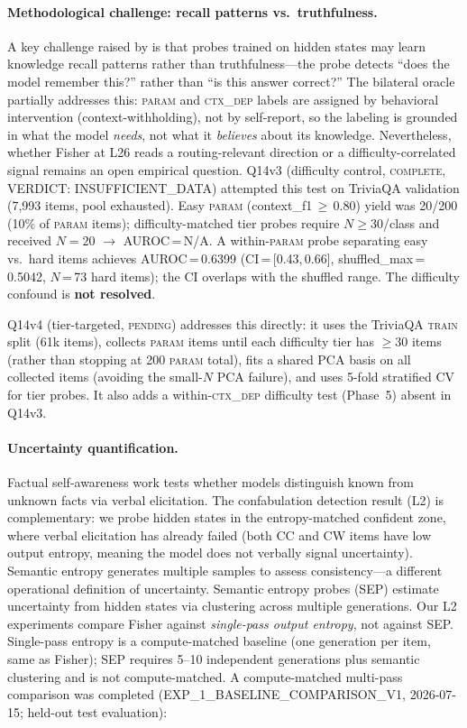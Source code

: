\documentclass[11pt]{article}
\begin{document}
\paragraph{Methodological challenge: recall patterns vs.\ truthfulness.}
A key challenge raised by \citet{dollmsknow2024} is that probes trained on hidden states
may learn knowledge recall patterns rather than truthfulness---the probe detects ``does
the model remember this?'' rather than ``is this answer correct?''
The bilateral oracle partially addresses this: \textsc{param} and \textsc{ctx\_dep}
labels are assigned by behavioral intervention (context-withholding), not by self-report,
so the labeling is grounded in what the model \emph{needs}, not what it \emph{believes}
about its knowledge.
Nevertheless, whether Fisher at L26 reads a routing-relevant direction or a
difficulty-correlated signal remains an open empirical question.
Q14v3 (difficulty control, \textsc{complete}, VERDICT: INSUFFICIENT\_DATA) attempted
this test on TriviaQA validation (7,993 items, pool exhausted). Easy \textsc{param}
(context\_f1\,$\geq$\,0.80) yield was 20/200 (10\% of \textsc{param} items);
difficulty-matched tier probes require $N\geq 30$/class and received $N=20$ $\to$ AUROC\,=\,N/A.
A within-\textsc{param} probe separating easy vs.\ hard items achieves AUROC\,=\,0.6399
(CI\,=\,[0.43,\,0.66], shuffled\_max\,=\,0.5042, $N$\,=\,73 hard items); the CI overlaps
with the shuffled range. The difficulty confound is \textbf{not resolved}.

Q14v4 (tier-targeted, \textsc{pending}) addresses this directly: it uses the TriviaQA
\textsc{train} split (61k items), collects \textsc{param} items until each difficulty
tier has $\geq 30$ items (rather than stopping at 200 \textsc{param} total), fits a
shared PCA basis on all collected items (avoiding the small-$N$ PCA failure), and uses
5-fold stratified CV for tier probes. It also adds a within-\textsc{ctx\_dep} difficulty
test (Phase~5) absent in Q14v3.

\paragraph{Uncertainty quantification.}
Factual self-awareness work \citep{kadavath2022know} tests whether models distinguish
known from unknown facts via verbal elicitation. The confabulation detection result (L2)
is complementary: we probe hidden states in the entropy-matched confident zone, where
verbal elicitation has already failed (both CC and CW items have low output entropy,
meaning the model does not verbally signal uncertainty).
Semantic entropy \citep{kuhn2023semantic} generates multiple samples to assess
consistency---a different operational definition of uncertainty. Semantic entropy
probes \citep{sepprobes2024} (SEP) estimate uncertainty from hidden states via
clustering across multiple generations.
Our L2 experiments compare Fisher against \emph{single-pass output entropy}, not
against SEP. Single-pass entropy is a compute-matched baseline (one generation per
item, same as Fisher); SEP requires 5--10 independent generations plus semantic
clustering and is not compute-matched.
A compute-matched multi-pass comparison was completed (EXP\_1\_BASELINE\_COMPARISON\_V1,
2026-07-15; held-out test evaluation):
\end{document}
